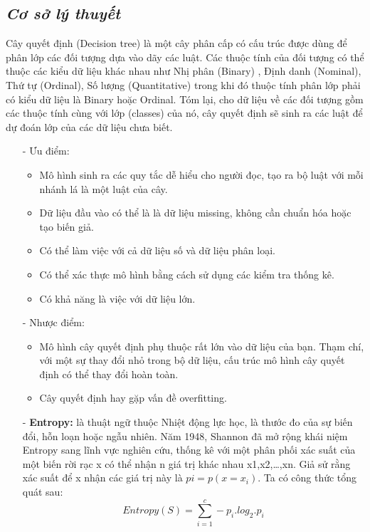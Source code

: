 \documentclass{report}
\begin{document}
\subsection{\textit{Cơ sở lý thuyết}}
    \fontsize{13}{14}\selectfont
    Cây quyết định (Decision tree) là một cây phân cấp có cấu trúc được dùng để phân lớp các đối tượng dựa vào dãy các luật. Các thuộc tính của đối tượng có thể thuộc các kiểu dữ liệu khác nhau như Nhị phân (Binary) , Định danh (Nominal), Thứ tự (Ordinal), Số lượng (Quantitative) trong khi đó thuộc tính phân lớp phải có kiểu dữ liệu là Binary hoặc Ordinal. Tóm lại, cho dữ liệu về các đối tượng gồm các thuộc tính cùng với lớp (classes) của nó, cây quyết định sẽ sinh ra các luật để dự đoán lớp của các dữ liệu chưa biết.
    \begin{enumerate}
        \item[- ]Ưu điểm: 
        \begin{itemize}
        \item Mô hình sinh ra các quy tắc dễ hiểu cho người đọc, tạo ra bộ luật với mỗi nhánh lá là một luật của cây.
        \item Dữ liệu đầu vào có thể là là dữ liệu missing, không cần chuẩn hóa hoặc tạo biến giả.
        \item Có thể làm việc với cả dữ liệu số và dữ liệu phân loại.
        \item Có thể xác thực mô hình bằng cách sử dụng các kiểm tra thống kê.
        \item Có khả năng là việc với dữ liệu lớn.
        \end{itemize}
        \item[- ]Nhược điểm: 
        \begin{itemize}
        \item Mô hình cây quyết định phụ thuộc rất lớn vào dữ liệu của bạn. Thạm chí, với một sự thay đổi nhỏ trong bộ dữ liệu, cấu trúc mô hình cây quyết định có thể thay đổi hoàn toàn.
        \item Cây quyết định hay gặp vấn đề overfitting.
        \end{itemize}
        \item [- ] \textbf{Entropy: } là thuật ngữ thuộc Nhiệt động lực học, là thước đo của sự biến đổi, hỗn loạn hoặc ngẫu nhiên. Năm 1948, Shannon đã mở rộng khái niệm Entropy sang lĩnh vực nghiên cứu, thống kê với một phân phối xác suất của một biến rời rạc x có thể nhận n giá trị khác nhau x1,x2,…,xn. Giả sử rằng xác suất để x nhận các giá trị này là $pi=p(x=x_i)$. Ta có công thức tổng quát sau:
        $$ Entropy(S) = \sum_{i=1}^{c} - p_i.log_2.p_i$$

\end{enumerate}
\end{document}
